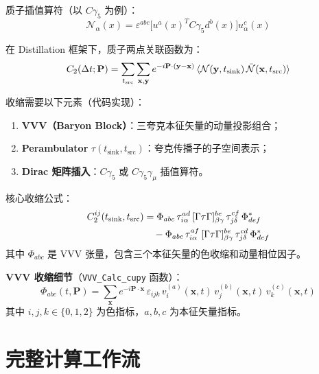\documentclass[11pt,a4paper]{ctexart}
\begin{document}
质子插值算符（以 $C\gamma_5$ 为例）：
\begin{equation}
\mathcal{N}_\alpha(x) = \varepsilon^{abc}
\bigl[ u^{a}(x)^T C\gamma_5 d^{b}(x) \bigr] u^{c}_\alpha(x)
\end{equation}

在 Distillation 框架下，质子两点关联函数为：
\begin{equation}
C_2(\Delta t; \mathbf{P}) = \sum_{t_{\text{src}}}
\sum_{\mathbf{x},\mathbf{y}} e^{-i\mathbf{P}\cdot(\mathbf{y}-\mathbf{x})}
\braket{\mathcal{N}(\mathbf{y}, t_{\text{sink}}) \,
\bar{\mathcal{N}}(\mathbf{x}, t_{\text{src}})}
\end{equation}

收缩需要以下元素（代码实现）：
\begin{enumerate}
  \item \textbf{VVV（Baryon Block）}：三夸克本征矢量的动量投影组合；
  \item \textbf{Perambulator} $\tau(t_{\text{sink}}, t_{\text{src}})$：夸克传播子的子空间表示；
  \item \textbf{Dirac 矩阵插入}：$C\gamma_5$ 或 $C\gamma_5\gamma_\mu$ 插值算符。
\end{enumerate}

核心收缩公式：
\begin{align}
C_2^{ij}(t_{\text{sink}}, t_{\text{src}}) &=
\Phi_{abc} \, \tau^{ad}_{i\alpha} \,
[\Gamma \tau \Gamma]^{be}_{\beta\gamma} \,
\tau^{cf}_{j\delta} \, \Phi_{def}^{*} \notag\\
&\quad - \Phi_{abc} \, \tau^{af}_{i\alpha} \,
[\Gamma \tau \Gamma]^{be}_{\beta\gamma} \,
\tau^{cd}_{j\delta} \, \Phi_{def}^{*}
\end{align}
其中 $\Phi_{abc}$ 是 VVV 张量，包含三个本征矢量的色收缩和动量相位因子。

\textbf{VVV 收缩细节}（\texttt{VVV\_Calc\_cupy} 函数）：
\begin{equation}\label{eq:vvv}
\Phi_{abc}(t, \mathbf{P}) = \sum_{\mathbf{x}} e^{-i\mathbf{P}\cdot\mathbf{x}} \,
\varepsilon_{ijk} \, v^{(a)}_i(\mathbf{x}, t) \,
v^{(b)}_j(\mathbf{x}, t) \, v^{(c)}_k(\mathbf{x}, t)
\end{equation}
其中 $i,j,k \in \{0,1,2\}$ 为色指标，$a,b,c$ 为本征矢量指标。

\section{完整计算工作流}
\end{document}

